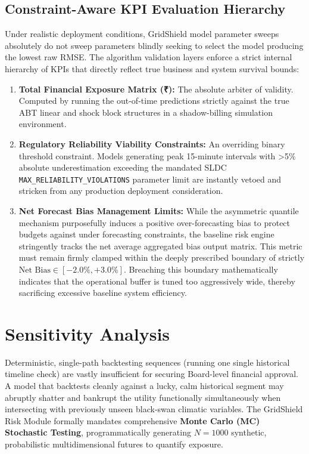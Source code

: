 \documentclass[11pt,a4paper]{article}
\begin{document}
\subsection{Constraint-Aware KPI Evaluation Hierarchy}
Under realistic deployment conditions, GridShield model parameter sweeps absolutely do not sweep parameters blindly seeking to select the model producing the lowest raw RMSE. The algorithm validation layers enforce a strict internal hierarchy of KPIs that directly reflect true business and system survival bounds:

\begin{enumerate}
    \item \textbf{Total Financial Exposure Matrix (₹):} The absolute arbiter of validity. Computed by running the out-of-time predictions strictly against the true ABT linear and shock block structures in a shadow-billing simulation environment. 
    \item \textbf{Regulatory Reliability Viability Constraints:} An overriding binary threshold constraint. Models generating peak 15-minute intervals with >5\% absolute underestimation exceeding the mandated SLDC \texttt{MAX\_RELIABILITY\_VIOLATIONS} parameter limit are instantly vetoed and stricken from any production deployment consideration.
    \item \textbf{Net Forecast Bias Management Limits:} While the asymmetric quantile mechanism purposefully induces a positive over-forecasting bias to protect budgets against under forecasting constraints, the baseline risk engine stringently tracks the net average aggregated bias output matrix. This metric must remain firmly clamped within the deeply prescribed boundary of strictly $\text{Net Bias} \in [-2.0\%, +3.0\%]$. Breaching this boundary mathematically indicates that the operational buffer is tuned too aggressively wide, thereby sacrificing excessive baseline system efficiency.
\end{enumerate}


\section{Sensitivity Analysis}

Deterministic, single-path backtesting sequences (running one single historical timeline check) are vastly insufficient for securing Board-level financial approval. A model that backtests cleanly against a lucky, calm historical segment may abruptly shatter and bankrupt the utility functionally simultaneously when intersecting with previously unseen black-swan climatic variables. The GridShield Risk Module formally mandates comprehensive \textbf{Monte Carlo (MC) Stochastic Testing}, programmatically generating $N=1000$ synthetic, probabilistic multidimensional futures to quantify exposure.
\end{document}
